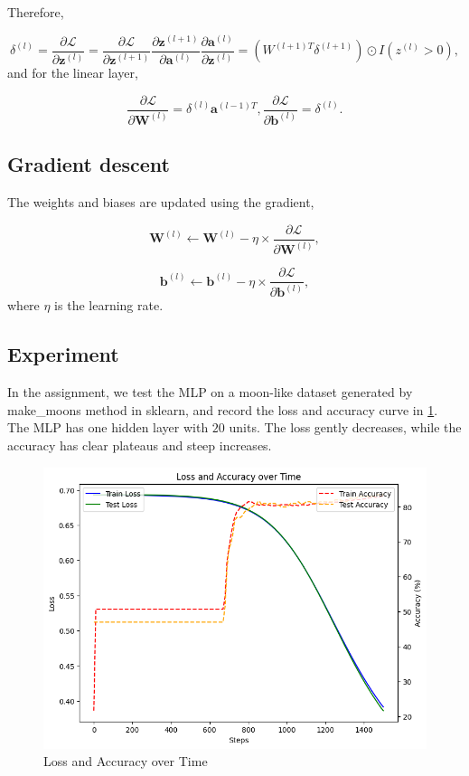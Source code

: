 \documentclass[12pt]{article}
\begin{document}
Therefore,

$$
\delta^{(l)} = \frac{\partial \mathcal{L}}{\partial \mathbf{z}^{(l)}}
= \frac{\partial \mathcal{L}}{\partial \mathbf{z}^{(l+1)}}
\frac{\partial \mathbf{z}^{(l+1)}}{\partial \mathbf{a}^{(l)}}
\frac{\partial \mathbf{a}^{(l)}}{\partial \mathbf{z}^{(l)}}
= (W^{(l+1)T} \delta^{(l+1)}) \odot I(z^{(l)} > 0),
$$ and for the linear layer,

$$
\frac{\partial \mathcal{L}}{\partial \mathbf{W}^{(l)}} = \delta^{(l)} \mathbf{a}^{(l-1)T}, \frac{\partial \mathcal{L}}{\partial \mathbf{b}^{(l)}} = \delta^{(l)}.
$$

\subsection{Gradient descent}

The weights and biases are updated using the gradient,

$$
\mathbf{W}^{(l)} \leftarrow \mathbf{W}^{(l)} - \eta \times \frac{\partial \mathcal{L}}{\partial \mathbf{W}^{(l)}},
$$

$$
\mathbf{b}^{(l)} \leftarrow \mathbf{b}^{(l)} - \eta \times \frac{\partial \mathcal{L}}{\partial \mathbf{b}^{(l)}},
$$ where $\eta$ is the learning rate.

\subsection{Experiment}

In the assignment, we test the MLP on a moon-like dataset generated by make\_moons method in sklearn, and record the loss and accuracy curve in \cref{fig:sec2_exp1}. The MLP has one hidden layer with $20$ units. The loss gently decreases, while the accuracy has clear plateaus and steep increases.

\begin{figure}
    \centering
    \includegraphics[width=0.5\linewidth]{fig_sec2_exp1.png}
    \caption{Loss and Accuracy over Time}
    \label{fig:sec2_exp1}
\end{figure}
\end{document}
